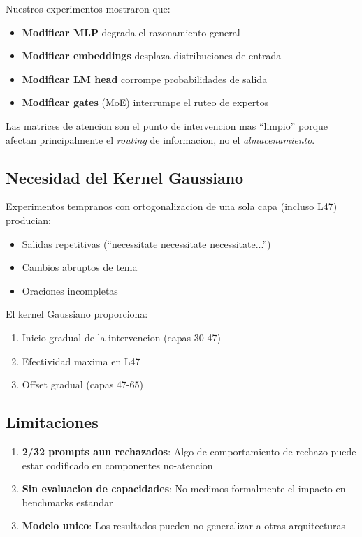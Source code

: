 \documentclass[11pt,a4paper]{article}
\begin{document}
Nuestros experimentos mostraron que:

\begin{itemize}
    \item \textbf{Modificar MLP} degrada el razonamiento general
    \item \textbf{Modificar embeddings} desplaza distribuciones de entrada
    \item \textbf{Modificar LM head} corrompe probabilidades de salida
    \item \textbf{Modificar gates} (MoE) interrumpe el ruteo de expertos
\end{itemize}

Las matrices de atencion son el punto de intervencion mas ``limpio'' porque afectan principalmente el \textit{routing} de informacion, no el \textit{almacenamiento}.

\subsection{Necesidad del Kernel Gaussiano}

Experimentos tempranos con ortogonalizacion de una sola capa (incluso L47) producian:

\begin{itemize}
    \item Salidas repetitivas (``necessitate necessitate necessitate...'')
    \item Cambios abruptos de tema
    \item Oraciones incompletas
\end{itemize}

El kernel Gaussiano proporciona:
\begin{enumerate}
    \item Inicio gradual de la intervencion (capas 30-47)
    \item Efectividad maxima en L47
    \item Offset gradual (capas 47-65)
\end{enumerate}

\subsection{Limitaciones}

\begin{enumerate}
    \item \textbf{2/32 prompts aun rechazados}: Algo de comportamiento de rechazo puede estar codificado en componentes no-atencion
    \item \textbf{Sin evaluacion de capacidades}: No medimos formalmente el impacto en benchmarks estandar
    \item \textbf{Modelo unico}: Los resultados pueden no generalizar a otras arquitecturas
\end{enumerate}
\end{document}
